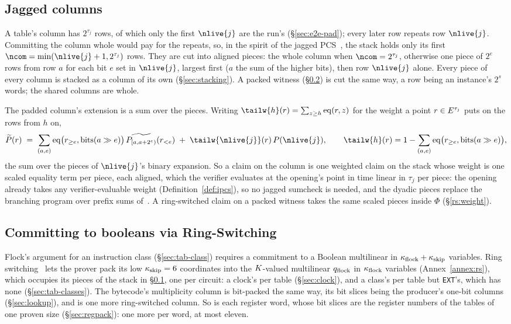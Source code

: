 \subsection{Jagged columns}\label{sec:jagged}

A table's column has $2^{\tau_j}$ rows, of which only the first $\nlive{j}$ are the run's (\S\ref{sec:e2e-pad}); every later row repeats row $\nlive{j}$. Committing the column whole would pay for the repeats, so, in the spirit of the jagged PCS~\cite{jagged_pcs}, the stack holds only its first $\ncom=\min(\nlive{j}+1,2^{\tau_j})$ rows. They are cut into aligned pieces: the whole column when $\ncom=2^{\tau_j}$, otherwise one piece of $2^e$ rows from row $a$ for each bit $e$ set in $\nlive{j}$, largest first ($a$ the sum of the higher bits), then row $\nlive{j}$ alone. Every piece of every column is stacked as a column of its own (\S\ref{sec:stacking}). A packed witness (\S\ref{sec:ringswitch}) is cut the same way, a row being an instance's $2^{s}$ words; the shared columns are whole.

The padded column's extension is a sum over the pieces. Writing $\tailw{h}(r)=\sum_{z\ge h}\eq(r,z)$ for the weight a point $r\in E^{\tau_j}$ puts on the rows from $h$ on,
\[
  \widetilde P(r)\;=\;\sum_{(a,e)}\eq\bigl(r_{\ge e},\mathrm{bits}(a\gg e)\bigr)\,\widetilde{P_{[a,a+2^e)}}(r_{<e})\;+\;\tailw{\nlive{j}}(r)\,P(\nlive{j}),\qquad \tailw{h}(r)=1-\sum_{(a,e)}\eq\bigl(r_{\ge e},\mathrm{bits}(a\gg e)\bigr),
\]
the sum over the pieces of $\nlive{j}$'s binary expansion. So a claim on the column is one weighted claim on the stack whose weight is one scaled equality term per piece, each aligned, which the verifier evaluates at the opening's point in time linear in $\tau_j$ per piece: the opening already takes any verifier-evaluable weight (Definition~\ref{def:ipcs}), so no jagged sumcheck is needed, and the dyadic pieces replace the branching program over prefix sums of~\cite{jagged_pcs}. A ring-switched claim on a packed witness takes the same scaled pieces inside $\Phi$ (\S\ref{rs:weight}).

\subsection{Committing to booleans via Ring-Switching}\label{sec:ringswitch}

Flock's argument for an instruction class (\S\ref{sec:tab-class}) requires a commitment to a Boolean multilinear in $\kappa_{\mathrm{flock}}+\kappa_{\mathrm{skip}}$ variables. Ring switching~\cite{DP24} lets the prover pack its low $\kappa_{\mathrm{skip}}=6$ coordinates into the $K$-valued multilinear $q_{\mathrm{flock}}$ in $\kappa_{\mathrm{flock}}$ variables (Annex~\ref{annex:rs}), which occupies its pieces of the stack in \S\ref{sec:jagged}, one per circuit: a clock's per table (\S\ref{sec:clock}), and a class's per table but \texttt{EXT}'s, which has none (\S\ref{sec:tab-classes}). The bytecode's multiplicity column is bit-packed the same way, its bit slices being the producer's one-bit columns (\S\ref{sec:lookup}), and is one more ring-switched column. So is each register word, whose bit slices are the register numbers of the tables of one proven size (\S\ref{sec:regpack}): one more per word, at most eleven.

